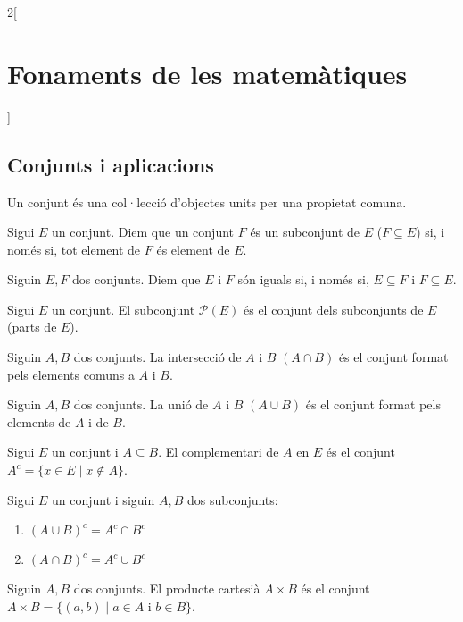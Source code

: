 \documentclass[../../../main.tex]{subfiles}
\begin{document}
\begin{multicols}{2}[\section{Fonaments de les matemàtiques}]
\subsection{Conjunts i aplicacions}
\begin{definition}
Un conjunt és una col·lecció d'objectes units per una propietat comuna.
\end{definition}
\begin{definition}
Sigui $E$ un conjunt. Diem que un conjunt $F$ és un subconjunt de $E$ ($F\subseteq E$) si, i només si, tot element de $F$ és element de $E$.
\end{definition}
\begin{definition}
Siguin $E,F$ dos conjunts. Diem que $E$ i $F$ són iguals si, i només si, $E\subseteq F$ i $F\subseteq E$.
\end{definition}
\begin{definition}
Sigui $E$ un conjunt. El subconjunt $\mathcal{P}(E)$ és el conjunt dels subconjunts de $E$ (parts de $E$).
\end{definition}
\begin{definition}
Siguin $A, B$ dos conjunts. La intersecció de $A$ i $B$ $(A\cap B)$ és el conjunt format pels elements comuns a $A$ i $B$.
\end{definition}
\begin{definition}
Siguin $A, B$ dos conjunts. La unió de $A$ i $B$ $(A\cup B)$ és el conjunt format pels elements de $A$ i de $B$.
\end{definition}
\begin{definition}
Sigui $E$ un conjunt i $A\subseteq B$. El complementari de $A$ en $E$ és el conjunt $A^c=\{x\in E\mid x\notin A\}$.
\end{definition}
\begin{prop}
Sigui $E$ un conjunt i siguin $A,B$ dos subconjunts:
\begin{enumerate}
    \item $(A\cup B)^c=A^c\cap B^c$
    \item $(A\cap B)^c=A^c\cup B^c$
\end{enumerate}
\end{prop}
\begin{definition}
Siguin $A, B$ dos conjunts. El producte cartesià $A\times B$ és el conjunt $A\times B=\{(a,b)\mid a\in A\text{ i }b\in B\}$.

\end{definition}
\end{multicols}
\end{document}

